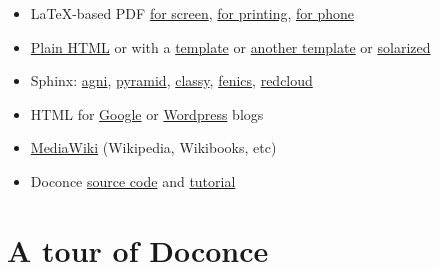 \documentclass[%
oneside,                 %
final,                   %
chapterprefix=true,      %
open=right               %
10pt]{book}
\begin{document}
\begin{itemize}
 \item LaTeX-based PDF \href{{http://hplgit.github.com/teamods/writing_reports/_static/report.pdf}}{for screen}, \href{{http://hplgit.github.com/teamods/writing_reports/_static/report_4printing.pdf}}{for printing}, \href{{http://hplgit.github.com/teamods/writing_reports/_static/report_4phone.pdf}}{for phone}

 \item \href{{http://hplgit.github.com/teamods/writing_reports/_static/report_do.html}}{Plain HTML} or with a \href{{http://hplgit.github.com/teamods/writing_reports/_static/report_vagrant.html}}{template} or \href{{http://hplgit.github.com/teamods/writing_reports/_static/report_github_minimal.html}}{another template} or \href{{http://hplgit.github.com/teamods/writing_reports/_static/report_solarized.html}}{solarized}

 \item Sphinx: \href{{http://hplgit.github.com/teamods/writing_reports/_static/sphinx-agni/index.html}}{agni}, \href{{http://hplgit.github.com/teamods/writing_reports/_static/sphinx-pyramid/report.html}}{pyramid}, \href{{http://hplgit.github.com/teamods/writing_reports/_static/sphinx-classy/report.html}}{classy}, \href{{http://hplgit.github.com/teamods/writing_reports/_static/sphinx-fenics_minimal/report.html}}{fenics}, \href{{http://hplgit.github.com/teamods/writing_reports/_static/sphinx-fenics_minimal/report.html}}{redcloud}

 \item HTML for \href{{http://doconce-report-demo.blogspot.no/}}{Google} or \href{{http://doconcereportdemo.wordpress.com/}}{Wordpress} blogs

 \item \href{{http://doconcedemo.shoutwiki.com/wiki/Doconce_demo_page}}{MediaWiki} (Wikipedia, Wikibooks, etc)

 \item Doconce \href{{http://hplgit.github.com/teamods/writing_reports/_static/report.do.txt.html}}{source code} and \href{{http://code.google.com/p/doconce/wiki/Tutorial}}{tutorial}
\end{itemize}

\noindent

\section{A tour of Doconce}
\end{document}
